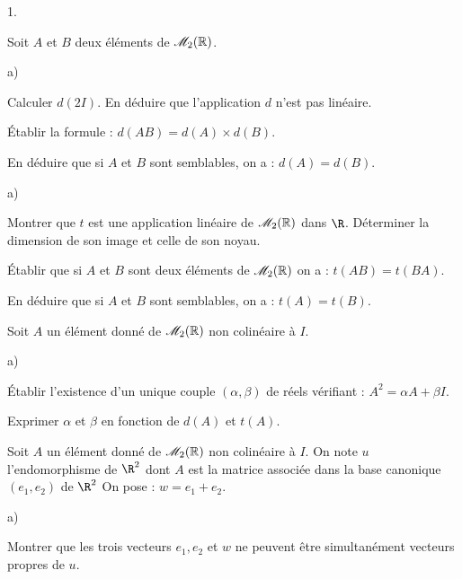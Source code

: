\documentclass[11pt]{article}%
\begin{document}
\begin{noliste}{1.}
 \setlength{\itemsep}{4mm}
\item Soit $A$ et $B$ deux éléments de $\mathscr{M}_{2}(\mathbb{R}) $.

\begin{noliste}{a)}
 \setlength{\itemsep}{2mm}
\item Calculer $d(2I)$. En déduire que l'application $d$ n'est pas
linéaire.

\item Établir la formule : $d(AB) = d(A)\times d(B)$.

\item En déduire que si $A$ et $B$ sont semblables, on a : $d(A) =
d(B)$.
\end{noliste}

\item 

\begin{noliste}{a)}
 \setlength{\itemsep}{2mm}
\item Montrer que $t$ est une application linéaire de $\mathscr{M}_{2}(\mathbb{R}) $ dans
$\R$. Déterminer la
dimension de son image et celle de son noyau.

\item Établir que si $A$ et $B$ sont deux éléments de $\mathscr{M}_{2}(\mathbb{R}) $ on a :
$t(AB) = t(BA)$.

\item En déduire que si $A$ et $B$ sont semblables, on a : $t(A) =
t(B)$.
\end{noliste}

\item Soit $A$ un élément donné de $\mathscr{M}_{2}(\mathbb{R}) $ non colinéaire à $I$.

\begin{noliste}{a)}
 \setlength{\itemsep}{2mm}
\item Établir l'existence d'un unique couple $\left( \alpha,\beta
\right) 
$ de réels vérifiant : $A^{2} = \alpha A + \beta I.$

\item Exprimer $\alpha$ et $\beta$ en fonction de $d(A)$ et $t(A)$.
\end{noliste}

\item Soit $A$ un élément donné de $\mathscr{M}_{2}(\mathbb{R}) $ non colinéaire à $I$. On
note $u$
l'endomorphisme de $\R^{2}$ dont $A$ est la matrice associée
dans la base canonique $\left( e_{1},e_{2}\right) $ de $\R^{2}$ On
pose : $w = e_{1} + e_{2}$.

\begin{noliste}{a)}
 \setlength{\itemsep}{2mm}
\item Montrer que les trois vecteurs $e_{1},e_{2}$ et $w$ ne peuvent
être simultanément vecteurs propres de $u$.


\end{noliste}
\end{noliste}
\end{document}

